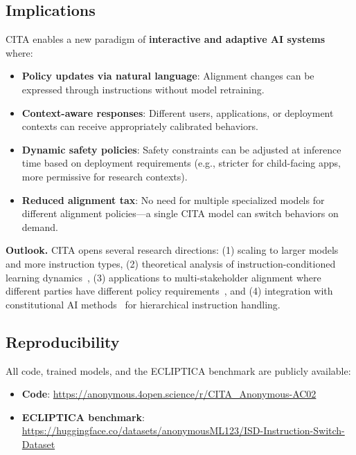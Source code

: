 \vspace{-2mm}
\subsection{Implications}
\label{sec:implications}

CITA enables a new paradigm of \textbf{interactive and adaptive AI systems} where:

\begin{itemize}[leftmargin=*,itemsep=2pt]
    \item \textbf{Policy updates via natural language}: Alignment changes can be expressed through instructions without model retraining.

    \item \textbf{Context-aware responses}: Different users, applications, or deployment contexts can receive appropriately calibrated behaviors.

    \item \textbf{Dynamic safety policies}: Safety constraints can be adjusted at inference time based on deployment requirements (e.g., stricter for child-facing apps, more permissive for research contexts).

    \item \textbf{Reduced alignment tax}: No need for multiple specialized models for different alignment policies---a single CITA model can switch behaviors on demand.
\end{itemize}

\textbf{Outlook.} CITA opens several research directions: (1) scaling to larger models~\cite{touvron2023llama,jiang2023mistral,team2023gemini,chowdhery2022palm} and more instruction types, (2) theoretical analysis of instruction-conditioned learning dynamics~\cite{azar2023general}, (3) applications to multi-stakeholder alignment where different parties have different policy requirements~\cite{sun2024trustllm}, and (4) integration with constitutional AI methods~\cite{bai2022constitutional} for hierarchical instruction handling.

\vspace{-2mm}
\subsection{Reproducibility}
\label{sec:reproducibility}

All code, trained models, and the ECLIPTICA benchmark are publicly available:

\begin{itemize}[leftmargin=*,itemsep=1pt]
    \item \textbf{Code}: \url{https://anonymous.4open.science/r/CITA_Anonymous-AC02}
    \item \textbf{ECLIPTICA benchmark}: \url{https://huggingface.co/datasets/anonymousML123/ISD-Instruction-Switch-Dataset}
\end{itemize}







